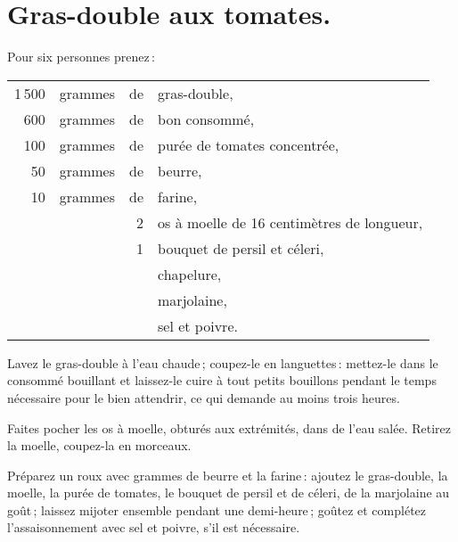 \section*{\centering Gras-double aux tomates.}

Pour six personnes prenez :

\medskip

\footnotesize
\begin{longtable}{rrrp{18em}}
  1 500 & grammes & de & gras-double,                                                                     \\
    600 & grammes & de & bon consommé,                                                                    \\
    100 & grammes & de & purée de tomates concentrée,                                                     \\
     50 & grammes & de & beurre,                                                                          \\
     10 & grammes & de & farine,                                                                          \\
        &         &  2 & os à moelle de 16 centimètres de longueur,                                       \\
        &         &  1 & bouquet de persil et céleri,                                                     \\
        &         &    & chapelure,                                                                       \\
        &         &    & marjolaine,                                                                      \\
        &         &    & sel et poivre.                                                                   \\
\end{longtable}
\normalsize

Lavez le gras-double à l'eau chaude ; coupez-le en languettes : mettez-le dans
le consommé bouillant et laissez-le cuire à tout petits bouillons pendant le
temps nécessaire pour le bien attendrir, ce qui demande au moins trois heures.

Faites pocher les os à moelle, obturés aux extrémités, dans de l'eau salée.
Retirez la moelle, coupez-la en morceaux.

Préparez un roux avec {\mmm} grammes de beurre et la farine : ajoutez le
gras-double, la moelle, la purée de tomates, le bouquet de persil et de céleri,
de la marjolaine au goût ; laissez mijoter ensemble pendant une demi-heure ;
goûtez et complétez l'assaisonnement avec sel et poivre, s'il est nécessaire.

